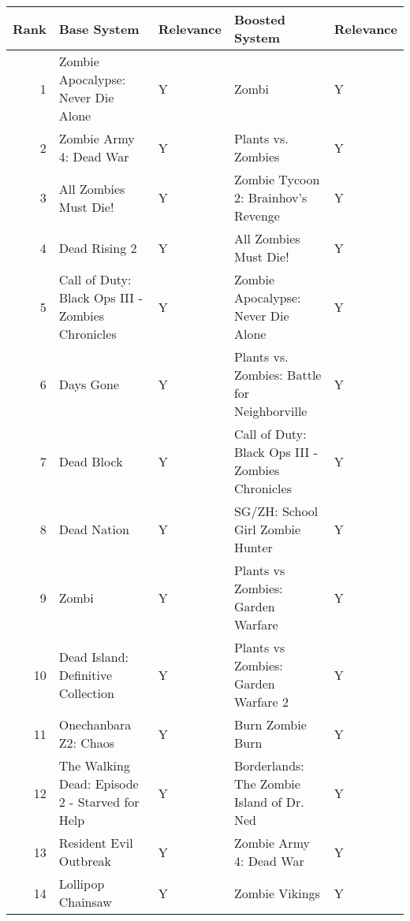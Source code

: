 \begin{tabular}{rllll}
\toprule
 Rank &                                      Base System & Relevance &                                     Boosted System & Relevance \\
\midrule
    1 &               Zombie Apocalypse: Never Die Alone &         Y &                                              Zombi &         Y \\
    2 &                          Zombie Army 4: Dead War &         Y &                                 Plants vs. Zombies &         Y \\
    3 &                            All Zombies Must Die! &         Y &                Zombie Tycoon 2: Brainhov's Revenge &         Y \\
    4 &                                    Dead Rising 2 &         Y &                              All Zombies Must Die! &         Y \\
    5 & Call of Duty: Black Ops III - Zombies Chronicles &         Y &                 Zombie Apocalypse: Never Die Alone &         Y \\
    6 &                                        Days Gone &         Y &       Plants vs. Zombies: Battle for Neighborville &         Y \\
    7 &                                       Dead Block &         Y &   Call of Duty: Black Ops III - Zombies Chronicles &         Y \\
    8 &                                      Dead Nation &         Y &                   SG/ZH: School Girl Zombie Hunter &         Y \\
    9 &                                            Zombi &         Y &                  Plants vs Zombies: Garden Warfare &         Y \\
   10 &               Dead Island: Definitive Collection &         Y &                Plants vs Zombies: Garden Warfare 2 &         Y \\
   11 &                            Onechanbara Z2: Chaos &         Y &                                   Burn Zombie Burn &         Y \\
   12 &   The Walking Dead: Episode 2 - Starved for Help &         Y &          Borderlands: The Zombie Island of Dr. Ned &         Y \\
   13 &                           Resident Evil Outbreak &         Y &                            Zombie Army 4: Dead War &         Y \\
   14 &                                Lollipop Chainsaw &         Y &                                     Zombie Vikings &         Y \\

\end{tabular}
